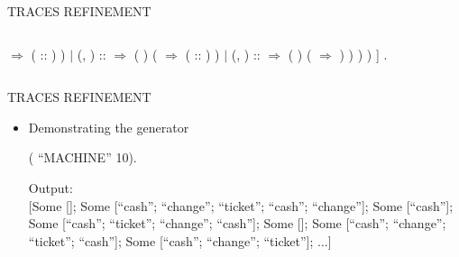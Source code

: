 \documentclass[t]{beamer}
\begin{document}
\begin{frame}{TRACES REFINEMENT}
\begin{itemize}
\begin{columns}
			\begin{coqdoccode}
				\scriptsize
				  \ensuremath{\Rightarrow}  (  :: )\coqdoceol
				\coqdocindent{7.00em}
				)\coqdoceol
				\coqdocindent{6.00em}
				\ensuremath{|} (, ) :: \coqdocvar{\_} \ensuremath{\Rightarrow}\coqdoceol
				\coqdocindent{7.00em}
				 (   ) (\coqdoceol
				\coqdocindent{8.00em}
				  \ensuremath{\Rightarrow}  ( :: )\coqdoceol
				\coqdocindent{7.00em}
				)\coqdoceol
				\coqdocindent{6.00em}
				\ensuremath{|} (, ) :: \coqdocvar{\_} \ensuremath{\Rightarrow}\coqdoceol
				\coqdocindent{7.00em}
				 (   ) (\coqdoceol
				\coqdocindent{8.00em}
				  \ensuremath{\Rightarrow}  \coqdoceol
				\coqdocindent{7.00em}
				)\coqdoceol
				\coqdocindent{6.00em}
				\coqdoceol
				\coqdocindent{5.00em}
				)\coqdoceol
				\coqdocindent{4.00em}
				)\coqdoceol
				\coqdocindent{3.00em}
				)\coqdoceol
				\coqdocindent{2.00em}
				]\coqdoceol
				\coqdocindent{1.00em}
				.\coqdoceol
			\end{coqdoccode}
		\end{columns}
	\end{itemize}
\end{frame}

\begin{frame}{TRACES REFINEMENT}
	\begin{itemize}
		\item Demonstrating the generator\\
		\vspace{2mm}
		\small
		\begin{coqdoccode}
			\coqdocnoindent
			 (  ``MACHINE'' 10).\coqdoceol
		\end{coqdoccode}
		\vspace{2mm}
		Output:\\
		\ttfamily
		{[Some []; Some [``cash''; ``change''; ``ticket''; ``cash''; ``change'']};
		{Some [``cash'']; Some [``cash''; ``ticket''; ``change''; ``cash'']; Some []};
		{Some [``cash''; ``change''; ``ticket''; ``cash'']; Some [``cash''; ``change''; ``ticket'']; $\dots$]}
	\end{itemize}
\end{frame}
\end{document}
